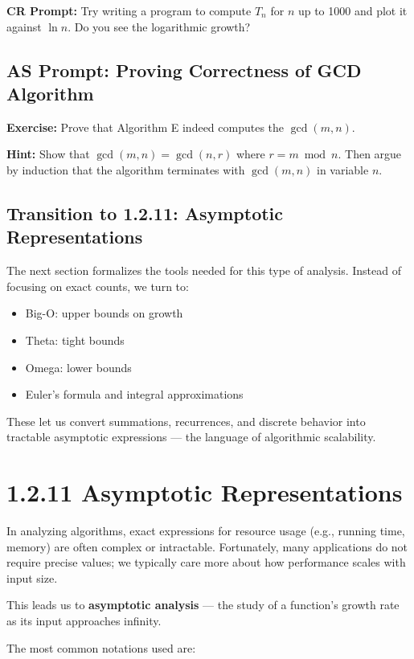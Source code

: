 \documentclass{article}
\begin{document}
\textbf{CR Prompt:} Try writing a program to compute $T_n$ for $n$ up to 1000 and plot it against $\ln n$. Do you see the logarithmic growth?

\subsection*{AS Prompt: Proving Correctness of GCD Algorithm}

\textbf{Exercise:} Prove that Algorithm E indeed computes the $\gcd(m,n)$.

\textbf{Hint:} Show that $\gcd(m,n) = \gcd(n, r)$ where $r = m \bmod n$. Then argue by induction that the algorithm terminates with $\gcd(m,n)$ in variable $n$.

\subsection*{Transition to 1.2.11: Asymptotic Representations}

The next section formalizes the tools needed for this type of analysis. Instead of focusing on exact counts, we turn to:

\begin{itemize}
    \item Big-O: upper bounds on growth
    \item Theta: tight bounds
    \item Omega: lower bounds
    \item Euler’s formula and integral approximations
\end{itemize}

These let us convert summations, recurrences, and discrete behavior into tractable asymptotic expressions — the language of algorithmic scalability.

\newpage

\section*{1.2.11 Asymptotic Representations}

In analyzing algorithms, exact expressions for resource usage (e.g., running time, memory) are often complex or intractable. Fortunately, many applications do not require precise values; we typically care more about how performance scales with input size.

This leads us to \textbf{asymptotic analysis} — the study of a function's growth rate as its input approaches infinity.

The most common notations used are:
\end{document}
